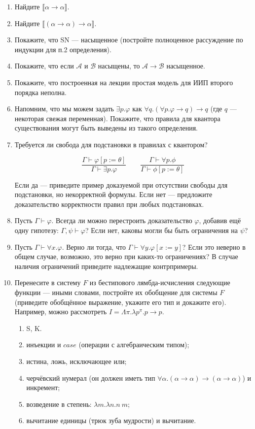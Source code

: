 \documentclass[10pt,a4paper,oneside]{article}
\begin{document}
\begin{enumerate}
\item Найдите $\llbracket\alpha\rightarrow\alpha\rrbracket$.
\item Найдите $\llbracket(\alpha\rightarrow\alpha)\rightarrow\alpha\rrbracket$.
\item Покажите, что SN --- насыщенное (постройте полноценное рассуждение по индукции для п.2 определения).
\item Покажите, что если $\mathcal{A}$ и $\mathcal{B}$ насыщены, то $\mathcal{A}\rightarrow\mathcal{B}$ насыщенное.

\item Покажите, что построенная на лекции простая модель для ИИП второго порядка неполна.
\item Напомним, что мы можем задать $\exists p.\varphi$ как $\forall q.(\forall p.\varphi\rightarrow q)\rightarrow q$
(где $q$ --- некоторая свежая переменная).
Покажите, что правила для квантора существования могут быть выведены из такого определения.
\item Требуется ли свобода для подстановки в правилах с квантором?

    \[ \dfrac{\Gamma\vdash\varphi[p := \theta]}{\Gamma\vdash\exists p.\varphi} \qquad
        \dfrac{\Gamma\vdash\forall p.\phi}{\Gamma\vdash\phi[p:=\theta]} \]

Если да --- приведите пример доказуемой при отсутствии свободы для подстановки, но некорректной формулы. 
Если нет --- предложите доказательство корректности правил при любых подстановках.

\item Пусть $\Gamma\vdash\varphi$. Всегда ли можно перестроить доказательство $\varphi$, добавив ещё одну гипотезу:
$\Gamma,\psi\vdash\varphi$? Если нет, каковы могли бы быть ограничения на $\psi$?

\item Пусть $\Gamma\vdash\forall x.\varphi$. Верно ли тогда, что $\Gamma\vdash\forall y.\varphi[x := y]$? 
Если это неверно в общем случае, возможно, это верно при каких-то ограничениях? В случае наличия ограничений
приведите надлежащие контрпримеры.

\item Перенесите в систему $F$ из бестипового лямбда-исчисления следующие функции --- иными словами,
постройте их обобщение для системы $F$ (приведите обобщённое выражение, укажите его тип и докажите его).
Например, можно рассмотреть $I = \Lambda \pi.\lambda p^\pi.p \rightarrow p$. 
\begin{enumerate}
\item S, K.
\item инъекции и $case$ (операции с алгебраическим типом);
\item истина, ложь, исключающее или;
\item черчёвский нумерал (он должен иметь тип $\forall\alpha.(\alpha\rightarrow\alpha)\rightarrow(\alpha\rightarrow\alpha)$) и инкремент;
\item возведение в степень: $\lambda m.\lambda n.n\ m$;
\item вычитание единицы (трюк зуба мудрости) и вычитание.
\end{enumerate}
\end{enumerate}
\end{document}
